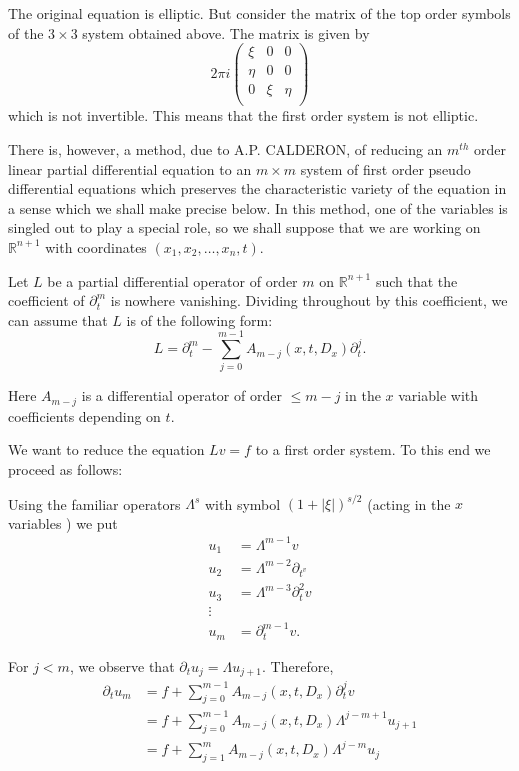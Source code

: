 The original equation is elliptic.  But consider the matrix of the top
order symbols of the $3 \times 3$  system obtained above.  The matrix
is given by  
$$
2 \pi i
\begin{pmatrix}
\xi & 0& 0\\
\eta & 0 &0\\
0& \xi & \eta \\
\end{pmatrix}
$$
which is not invertible. This means that the first order system is not
elliptic. 

There is, however,  a method,  due to A.P. CALDERON, of reducing an
$m^{th}$ order linear partial differential equation to an $m \times m$
system of first order pseudo differential equations which preserves
the characteristic variety of the equation in a sense which we shall
make precise below. In this method, one of the variables is singled
out to play a special role, so we shall suppose that we are working on
$\mathbb{R}^{n+1}$ with coordinates $(x_1,x_2, \ldots,x_n,t)$. 

Let $L$ be a partial differential operator of order $m$ on
$\mathbb{R}^{n+1}$ such that the coefficient of $\partial^m_t$ is
nowhere vanishing.  Dividing throughout by this coefficient, we can
assume that $L$ is of the following form:  
$$
L= \partial_t ^m - \sum_{j=0}^{m-1} A_{m-j}(x, t, D_x) \partial_t ^j.
$$\pageoriginale

Here $A_{m-j}$ is a differential operator of order $\leq m-j$ in the
$x$ variable with coefficients depending on $t$. 

We want to reduce the equation $Lv=f $ to  a first order system. To
this end we proceed as follows:  

Using the familiar operators $ \Lambda ^s$ with symbol $(1+ | \xi | )
^{s/2} $ (acting in the $x$ variables ) we put 
\begin{align*}
  u_1 &= \Lambda^{m-1} v\\
  u_ 2&= \Lambda^{m-2} \partial _{t^ v}\\
  u_ 3&= \Lambda^{m-3} \partial _t ^2 v\\
  \vdots\\
  u_m &= \partial _t ^{m-1}v.
\end{align*}

For $j < m$, we observe that $ \partial_t u_j = \Lambda u_{j+1}$. Therefore,
\begin{align*}
  \partial _t u_m &= f + \sum _{j=0}^{m-1} A_{m-j}(x,t,D_{x}) \partial _t ^j v\\
  &=f + \sum_{j=0}^{m-1}A_{m-j}(x,t,D_x) \Lambda^{j-m+1}u_{j+1}\\
  &=f + \sum_{j=1}^{m}A_{m-j}(x,t,D_x) \Lambda^{j-m}u_{j}
\end{align*}


